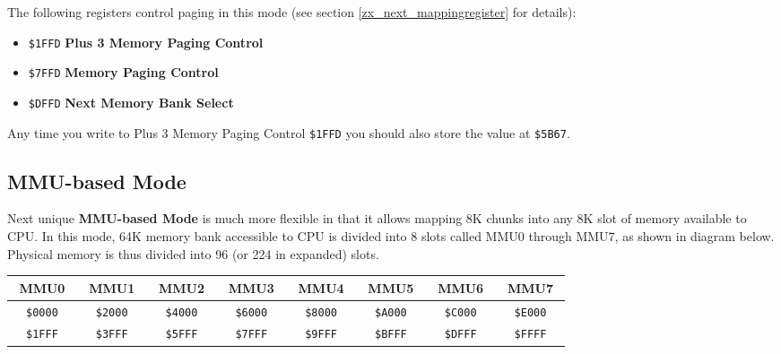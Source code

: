 \documentclass[twoside,openright,a4paper]{book}
\newcommand{\notet}{\rule{0pt}{2.4ex}}
\newcommand{\noteb}{\rule[-1.3ex]{0pt}{0pt}}
\begin{document}
The following registers control paging in this mode (see section \ref{zx_next_mappingregister} for details):

\begin{itemize}
	\item {\tt \$1FFD} \textbf{Plus 3 Memory Paging Control}
	\item {\tt \$7FFD} \textbf{Memory Paging Control}
	\item {\tt \$DFFD} \textbf{Next Memory Bank Select}
\end{itemize}

Any time you write to Plus 3 Memory Paging Control {\tt \$1FFD} you should also store the value at {\tt \$5B67}.

\pagebreak
\subsection{MMU-based Mode}
\label{zx_next_bank_mmu_mode}

Next unique \textbf{MMU-based Mode} is much more flexible in that it allows mapping 8K chunks into any 8K slot of memory available to CPU. In this mode, 64K memory bank accessible to CPU is divided into 8 slots called MMU0 through MMU7, as shown in diagram below. Physical memory is thus divided into 96 (or 224 in expanded) slots.

\begingroup
	\setlength{\tabcolsep}{1pt}
	\begin{tabular}{|cccc|cccc|cccc|cccc|cccc|cccc|cccc|cccc|}
		\hline
		\multicolumn{4}{|c}{MMU0}\notet\noteb & 
			\multicolumn{4}{|c}{MMU1} & 
			\multicolumn{4}{|c}{MMU2} & 
			\multicolumn{4}{|c}{MMU3} & 
			\multicolumn{4}{|c}{MMU4} & 
			\multicolumn{4}{|c}{MMU5} & 
			\multicolumn{4}{|c}{MMU6} & 
			\multicolumn{4}{|c|}{MMU7} \\
		\hline
		\colnoline{$\leftarrow$}\notet & \multicolumn{2}{c}{\tt \$0000} & \colnoline{} &
			\colnoline{$\leftarrow$}\notet & \multicolumn{2}{c}{\tt \$2000} & \colnoline{} &
			\colnoline{$\leftarrow$}\notet & \multicolumn{2}{c}{\tt \$4000} & \colnoline{} &
			\colnoline{$\leftarrow$}\notet & \multicolumn{2}{c}{\tt \$6000} & \colnoline{} &
			\colnoline{$\leftarrow$}\notet & \multicolumn{2}{c}{\tt \$8000} & \colnoline{} &
			\colnoline{$\leftarrow$}\notet & \multicolumn{2}{c}{\tt \$A000} & \colnoline{} &
			\colnoline{$\leftarrow$}\notet & \multicolumn{2}{c}{\tt \$C000} & \colnoline{} &
			\colnoline{$\leftarrow$}\notet & \multicolumn{2}{c}{\tt \$E000} & \colnoline{} \\
		\colnoline{} & \multicolumn{2}{c}{\tt \$1FFF} & \colnoline{$\rightarrow$} &
			\colnoline{} & \multicolumn{2}{c}{\tt \$3FFF} & \colnoline{$\rightarrow$} &
			\colnoline{} & \multicolumn{2}{c}{\tt \$5FFF} & \colnoline{$\rightarrow$} &
			\colnoline{} & \multicolumn{2}{c}{\tt \$7FFF} & \colnoline{$\rightarrow$} &
			\colnoline{} & \multicolumn{2}{c}{\tt \$9FFF} & \colnoline{$\rightarrow$} &
			\colnoline{} & \multicolumn{2}{c}{\tt \$BFFF} & \colnoline{$\rightarrow$} &
			\colnoline{} & \multicolumn{2}{c}{\tt \$DFFF} & \colnoline{$\rightarrow$} &
			\colnoline{} & \multicolumn{2}{c}{\tt \$FFFF} & \colnoline{$\rightarrow$} \\
	\end{tabular}
\endgroup
\end{document}
